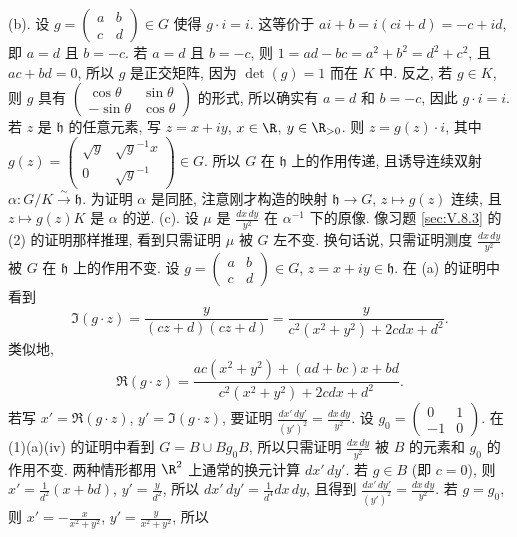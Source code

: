 \begin{solution}
(b). 设 $g = \begin{pmatrix} a & b \\ c & d \end{pmatrix} \in G$ 使得 $g \cdot i = i$. 这等价于 $ai + b = i(ci + d) = -c + id$, 即 $a = d$ 且 $b = -c$. 若 $a = d$ 且 $b = -c$, 则 $1 = ad - bc = a^2 + b^2 = d^2 + c^2$, 且 $ac + bd = 0$, 所以 $g$ 是正交矩阵, 因为 $\det(g) = 1$ 而在 $K$ 中. 反之, 若 $g \in K$, 则 $g$ 具有 $\begin{pmatrix} \cos\theta & \sin\theta \\ -\sin\theta & \cos\theta \end{pmatrix}$ 的形式, 所以确实有 $a = d$ 和 $b = -c$, 因此 $g \cdot i = i$.
若 $z$ 是 $\mathfrak{h}$ 的任意元素, 写 $z = x + iy$, $x \in \R$, $y \in \R_{>0}$. 则 $z = g(z) \cdot i$, 其中 $g(z) = \begin{pmatrix} \sqrt{y} & \sqrt{y}^{-1}x \\ 0 & \sqrt{y}^{-1} \end{pmatrix} \in G$. 所以 $G$ 在 $\mathfrak{h}$ 上的作用传递, 且诱导连续双射 $\alpha \colon G/K \xrightarrow{\sim} \mathfrak{h}$. 为证明 $\alpha$ 是同胚, 注意刚才构造的映射 $\mathfrak{h} \to G$, $z \longmapsto g(z)$ 连续, 且 $z \longmapsto g(z)K$ 是 $\alpha$ 的逆.
(c). 设 $\mu$ 是 $\frac{dx\,dy}{y^2}$ 在 $\alpha^{-1}$ 下的原像. 像习题 \ref{sec:V.8.3} 的 (2) 的证明那样推理, 看到只需证明 $\mu$ 被 $G$ 左不变. 换句话说, 只需证明测度 $\frac{dx\,dy}{y^2}$ 被 $G$ 在 $\mathfrak{h}$ 上的作用不变.
设 $g = \begin{pmatrix} a & b \\ c & d \end{pmatrix} \in G$, $z = x + iy \in \mathfrak{h}$. 在 (a) 的证明中看到
\[
\Im(g \cdot z) = \frac{y}{(cz + d)(cz + d)} = \frac{y}{c^2(x^2 + y^2) + 2cdx + d^2}.
\]
类似地,
\[
\Re(g \cdot z) = \frac{ac(x^2 + y^2) + (ad + bc)x + bd}{c^2(x^2 + y^2) + 2cdx + d^2}.
\]
若写 $x' = \Re(g \cdot z)$, $y' = \Im(g \cdot z)$, 要证明 $\frac{dx'\,dy'}{(y')^2} = \frac{dx\,dy}{y^2}$.
设 $g_0 = \begin{pmatrix} 0 & 1 \\ -1 & 0 \end{pmatrix}$. 在 (1)(a)(iv) 的证明中看到 $G = B \cup Bg_0B$, 所以只需证明 $\frac{dx\,dy}{y^2}$ 被 $B$ 的元素和 $g_0$ 的作用不变. 两种情形都用 $\R^2$ 上通常的换元计算 $dx'\,dy'$.
若 $g \in B$ (即 $c = 0$), 则 $x' = \frac{1}{d^2}(x + bd)$, $y' = \frac{y}{d^2}$, 所以 $dx'\,dy' = \frac{1}{d^4}dx\,dy$, 且得到 $\frac{dx'\,dy'}{(y')^2} = \frac{dx\,dy}{y^2}$.
若 $g = g_0$, 则 $x' = -\frac{x}{x^2 + y^2}$, $y' = \frac{y}{x^2 + y^2}$, 所以

\end{solution}
